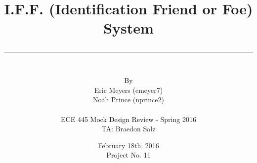 \documentclass[letterpaper,10pt]{article}
\author{\vspace{.4in}\\
	\textcolor{black}{By}\\
	#1
	\vspace{1in}\\
	\textcolor{black}{ECE 445 Mock Design Review -} #2\\
	\textcolor{black}{TA:} #3
	\vspace{1in}}
\newcommand{\thetitle}[1]{\title{\begin{huge}{\bf #1}\end{huge} \color{subtitlecolor}\rule[25pt]{\textwidth}{1pt}}}
\newcommand{\theauthor}[3]{
	\author{\vspace{.4in}\\
	\textcolor{black}{By}\\
	#1
	\vspace{1in}\\
	\textcolor{black}{ECE 445 Mock Design Review -} #2\\
	\textcolor{black}{TA:} #3
	\vspace{1in}}
}
\begin{document}
\pagestyle{empty}
\doublespacing

\thetitle{{I.F.F. (Identification Friend or Foe) System}}

\theauthor{
	{Eric Meyers (emeyer7)}\\
	{Noah Prince (nprince2)}\\
}
{ %
	{Spring 2016}
}
{ %
	{Braedon Salz}
}

\date{
{February 18th, 2016}\\
Project No. 11
\clearpage
}
\end{document}
